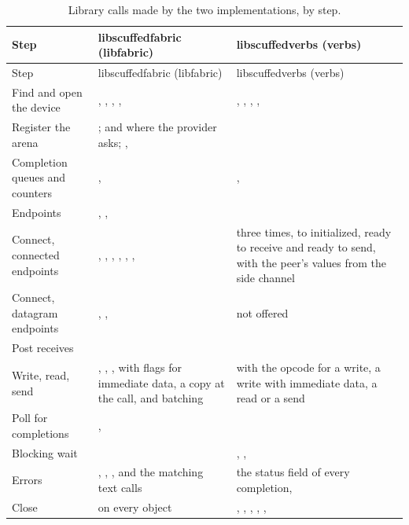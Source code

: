 \begin{tightblock}
\begin{longtable}{L{2.9cm}L{5.7cm}L{5.6cm}}
  \caption[Library calls made by the two implementations, by step]{Library calls made by the two implementations, by step.}\label{tab:calls}\\
  \toprule
  Step & libscuffedfabric (libfabric) & libscuffedverbs (verbs) \\
  \midrule
  \endfirsthead
  \toprule
  Step & libscuffedfabric (libfabric) & libscuffedverbs (verbs) \\
  \midrule
  \endhead
  Find and open the device & , , , ,  & , , , ,  \\
  Register the arena & ;  and  where the provider asks; ,  &  \\
  Completion queues and counters & ,  & ,  \\
  Endpoints & , ,  &  \\
  Connect, connected endpoints & , , , , , ,  &  three times, to initialized, ready to receive and ready to send, with the peer's values from the side channel \\
  Connect, datagram endpoints & , ,  & not offered \\
  Post receives &  &  \\
  Write, read, send & , , , with flags for immediate data, a copy at the call, and batching &  with the opcode for a write, a write with immediate data, a read or a send \\
  Poll for completions & ,  &  \\
  Blocking wait &  & , ,  \\
  Errors & , , , and the matching text calls & the status field of every completion,  \\
  Close &  on every object & , , , , ,  \\
  \bottomrule
\end{longtable}
\end{tightblock}


